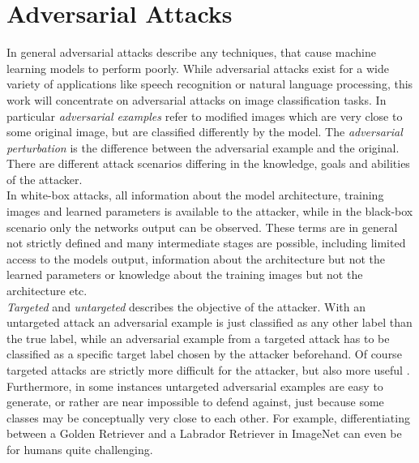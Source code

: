 
\newcommand{\norm}[1]{\left \lVert #1 \right \rVert _2}
\newcommand{\abs}[1]{\left \lvert #1 \right \rvert}

\section{Adversarial Attacks}

In general adversarial attacks describe any techniques, that cause machine learning models to perform poorly.
While adversarial attacks exist for a wide variety of applications like speech recognition or natural language processing, this work will concentrate on adversarial attacks on image classification tasks.
In particular \emph{adversarial examples} refer to modified images which are very close to some original image, but are classified differently by the model.
The \emph{adversarial perturbation} is the difference between the adversarial example and the original. \\
There are different attack scenarios differing in the knowledge, goals and abilities of the attacker. \\
In white-box attacks, all information about the model architecture, training images and learned parameters is available to the attacker, while in the black-box scenario only the networks output can be observed. These terms are in general not strictly defined and many intermediate stages are possible, including limited access to the models output, information about the architecture but not the learned parameters or knowledge about the training images but not the architecture etc. \\
\emph{Targeted} and \emph{untargeted} describes the objective of the attacker. With an untargeted attack an adversarial example is just classified as any other label than the true label, while an adversarial example from a targeted attack has to be classified as a specific target label chosen by the attacker beforehand. Of course targeted attacks are strictly more difficult for the attacker, but also more useful .
Furthermore, in some instances untargeted adversarial examples are easy to generate, or rather are near impossible to defend against, just because some classes may be conceptually very close to each other.
For example, differentiating between a Golden Retriever and a Labrador Retriever in ImageNet \cite{imagenet} can even be for humans quite challenging. \\

